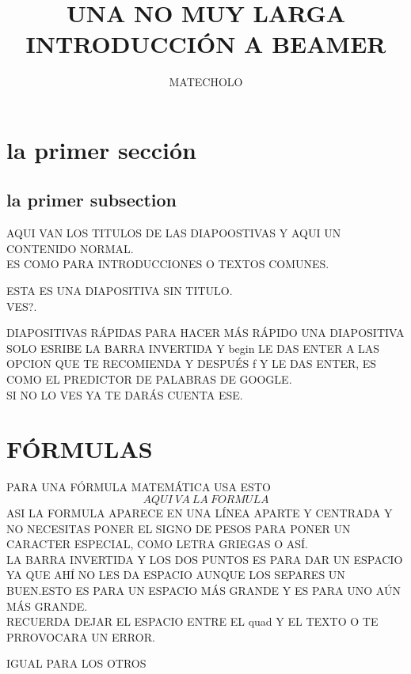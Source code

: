 \documentclass[11pt]{beamer}
\author{MATECHOLO}
\title{UNA NO MUY LARGA INTRODUCCIÓN A BEAMER}
\begin{document}
\begin{frame}
\titlepage
\end{frame}

\begin{frame}
\tableofcontents
\end{frame}

\section{la primer sección}
\subsection{la primer subsection}
\begin{frame}{AQUI VAN LOS TITULOS DE LAS DIAPOOSTIVAS}
Y AQUI UN CONTENIDO NORMAL.\\
ES COMO PARA INTRODUCCIONES O TEXTOS COMUNES.
\end{frame}

\begin{frame}
ESTA ES UNA DIAPOSITIVA SIN TITULO.\\
VES?.
\end{frame}

\begin{frame}{DIAPOSITIVAS RÁPIDAS}
PARA HACER MÁS RÁPIDO UNA DIAPOSITIVA SOLO ESRIBE LA BARRA INVERTIDA Y  begin LE DAS ENTER A LAS OPCION QUE TE RECOMIENDA Y DESPUÉS f Y LE DAS ENTER, ES COMO EL PREDICTOR DE PALABRAS DE GOOGLE.\\
SI NO LO VES YA TE DARÁS CUENTA ESE.
\end{frame}

\section{FÓRMULAS}
\begin{frame}
PARA UNA FÓRMULA MATEMÁTICA USA ESTO \[AQUI\:VA\:LA\:FORMULA\] ASI LA FORMULA APARECE EN UNA LÍNEA APARTE Y CENTRADA Y NO NECESITAS PONER EL SIGNO DE PESOS PARA PONER UN CARACTER ESPECIAL, COMO LETRA GRIEGAS O ASÍ. \\
LA BARRA INVERTIDA Y LOS DOS PUNTOS ES PARA DAR UN ESPACIO YA QUE AHÍ NO LES DA ESPACIO AUNQUE LOS SEPARES UN BUEN.\quad ESTO ES PARA UN ESPACIO MÁS GRANDE Y \qquad ES PARA UNO AÚN MÁS GRANDE.\\
RECUERDA DEJAR EL ESPACIO ENTRE EL quad Y EL TEXTO O TE PRROVOCARA UN ERROR.\\
\begin{center}
IGUAL PARA LOS OTROS
\end{center}
\end{frame}
\end{document}

